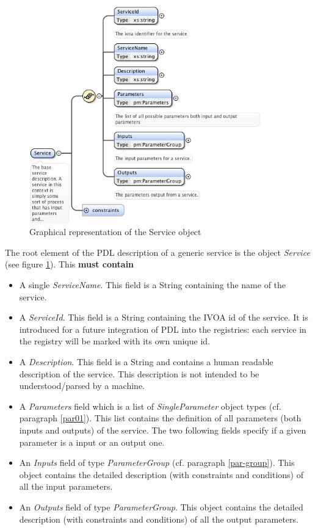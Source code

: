 \documentclass[a4paper,11pt] {ivoa}
\begin{document}
\begin{figure}[htbp]
\begin{center}
\includegraphics[width=0.9\textwidth]{pictures/Service.jpg} 
\caption{Graphical representation of the Service object}
\label{Pic-Service}
\end{center}
\end{figure}

The root element of the PDL description of a generic service is the object {\it Service} (see figure
\ref{Pic-Service}). This {\bf must contain}
\begin{itemize}
\item A single {\it ServiceName}. This field is a String containing the name of the service.
\item A  {\it ServiceId}. This field is a String containing the IVOA id of the service.
It is introduced for a future  integration of PDL into the registries: each service in
the registry will be marked with its own unique id.
\item A  {\it Description}. This field is a String and contains a human readable description
of the service. This description is not intended to be understood/parsed by a machine.
\item A {\it Parameters} field which is a list of {\it SingleParameter} object types (cf.
paragraph \ref{par01}). This list contains the definition of all parameters (both inputs and
outputs) of the service. The two following fields specify if a given parameter is a input or an
output one.
\item An {\it Inputs} field of type {\it ParameterGroup} (cf. paragraph \ref{par-group}). This
object contains the detailed description (with constraints and conditions) of all the input
parameters.
\item An {\it Outputs} field of type {\it ParameterGroup}. This object contains the detailed
description (with constraints and conditions) of all the output parameters.
\end{itemize}
\end{document}
